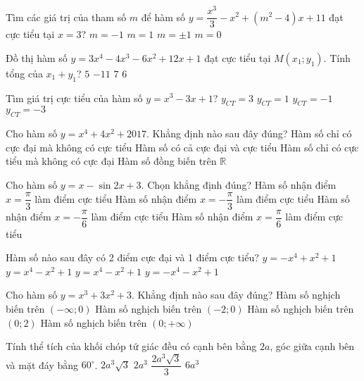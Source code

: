 \begin{ex}%
	Tìm các giá  trị của tham số $m$ để hàm số $y=\dfrac{x^3}{3}-x^2+\left(m^2-4\right)x+11$ đạt cực tiểu tại $x=3$?
\choice
	{$m=-1$}
	{$m=1$}
	{\True $m=\pm 1$}
	{$m=0$}
\end{ex}
\begin{ex}%
	Đồ thị hàm số $y=3x^4-4x^3-6x^2+12x+1$ đạt cực tiểu tại $M\left(x_1;y_1\right)$. Tính tổng của $x_1+y_1$?
\choice
	{$5$}
	{\True $-11$}
	{$7$}
	{$6$}
\end{ex}
\begin{ex}%
	Tìm giá trị cực tiểu của hàm số $y=x^3-3x+1$?
\choice
	{$y_{CT}=3$}
	{$y_{CT}=1$}
	{\True $y_{CT}=-1$}
	{$y_{CT}=-3$} 
\end{ex}
\begin{ex}%
	Cho hàm số $y=x^4+4x^2+2017$. Khẳng định nào sau đây đúng?
\choice
	{Hàm số chỉ có cực đại mà không có cực tiểu}
	{Hàm số có cả cực đại và cực tiểu}
	{\True Hàm số chỉ có cực tiểu mà không có cực đại}
	{Hàm số đồng biến trên $\mathbb{R}$} 
\end{ex}
\begin{ex}%
	Cho hàm số $y=x-\sin {2x}+3$. Chọn khẳng định đúng?
\choice
	{Hàm số nhận điểm $x=\dfrac{\pi}{3}$ làm điểm cực tiểu}
	{\True Hàm số nhận điểm $x=-\dfrac{\pi}{3}$ làm điểm cực tiểu}
	{Hàm số nhận điểm $x=-\dfrac{\pi}{6}$ làm điểm cực tiểu}
	{Hàm số nhận điểm $x=\dfrac{\pi}{6}$ làm điểm cực tiểu}
\end{ex}
\begin{ex}%
	Hàm số nào sau đây có 2 điểm cực đại và 1 điểm cực tiểu?
\choice
	{\True $y=-x^4+x^2+1$}
	{$y=x^4-x^2+1$}
	{$y=x^4-x^2+1$}
	{$y=-x^4-x^2+1$} 
\end{ex}
\begin{ex}%
	Cho hàm số $y=x^3+3x^2+3$. Khẳng định nào sau đây đúng?
\choice
	{Hàm số nghịch biến trên $\left(-\infty;0\right)$}
	{\True Hàm số nghịch biến trên $\left(-2;0\right)$}
	{Hàm số nghịch biến trên $\left(0;2\right)$}
	{Hàm số nghịch biến trên $\left(0;+\infty\right)$}
\end{ex}
\begin{ex}%
	Tính thể tích của khối chóp tứ giác đều có cạnh bên bằng $2a$, góc giữa cạnh bên và mặt đáy bằng $60^{\circ}$.
\choice
	{$2a^3\sqrt{3}$}
	{$2a^3$}
	{\True $\dfrac{2a^3\sqrt{3}}{3}$}
	{$6a^3$}
\end{ex}
